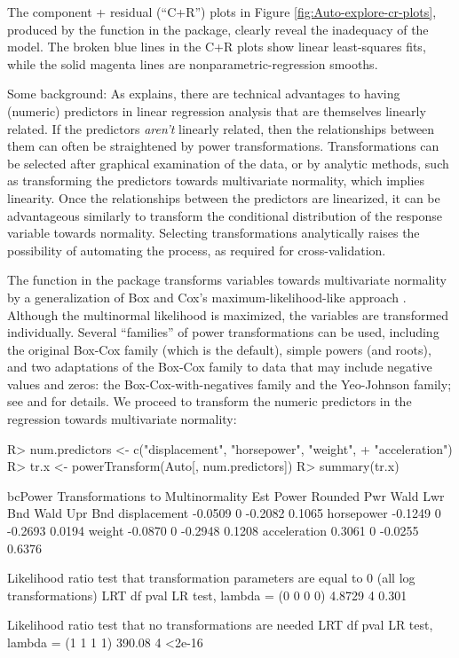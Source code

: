 \documentclass[
]{jss}
\begin{document}
The component + residual (``C+R'') plots in Figure
\ref{fig:Auto-explore-cr-plots}, produced by the 
function in the  package, clearly reveal the inadequacy of the
model. The broken blue lines in the C+R plots show linear least-squares
fits, while the solid magenta lines are nonparametric-regression
smooths.

Some background: As \citet[Sec.~8.2]{Weisberg:2014} explains, there are
technical advantages to having (numeric) predictors in linear regression
analysis that are themselves linearly related. If the predictors
\emph{aren't} linearly related, then the relationships between them can
often be straightened by power transformations. Transformations can be
selected after graphical examination of the data, or by analytic
methods, such as transforming the predictors towards multivariate
normality, which implies linearity. Once the relationships between the
predictors are linearized, it can be advantageous similarly to transform
the conditional distribution of the response variable towards normality.
Selecting transformations analytically raises the possibility of
automating the process, as required for cross-validation.

The  function in the  package transforms
variables towards multivariate normality by a generalization of Box and
Cox's maximum-likelihood-like approach \citep{BoxCox:1964}. Although the
multinormal likelihood is maximized, the variables are transformed
individually. Several ``families'' of power transformations can be used,
including the original Box-Cox family (which is the default), simple
powers (and roots), and two adaptations of the Box-Cox family to data
that may include negative values and zeros: the Box-Cox-with-negatives
family and the Yeo-Johnson family; see \citet[Chap.~8]{Weisberg:2014}
and \citet[Chap.~3]{FoxWeisberg:2019} for details. We proceed to
transform the numeric predictors in the  regression towards
multivariate normality:

\begin{CodeChunk}
\begin{CodeInput}
R> num.predictors <- c("displacement", "horsepower", "weight",
+                     "acceleration")
R> tr.x <- powerTransform(Auto[, num.predictors])
R> summary(tr.x)
\end{CodeInput}
\begin{CodeOutput}
bcPower Transformations to Multinormality
             Est Power Rounded Pwr Wald Lwr Bnd Wald Upr Bnd
displacement   -0.0509           0      -0.2082       0.1065
horsepower     -0.1249           0      -0.2693       0.0194
weight         -0.0870           0      -0.2948       0.1208
acceleration    0.3061           0      -0.0255       0.6376

Likelihood ratio test that transformation parameters are equal to 0
 (all log transformations)
                               LRT df  pval
LR test, lambda = (0 0 0 0) 4.8729  4 0.301

Likelihood ratio test that no transformations are needed
                               LRT df   pval
LR test, lambda = (1 1 1 1) 390.08  4 <2e-16
\end{CodeOutput}
\end{CodeChunk}
\end{document}

